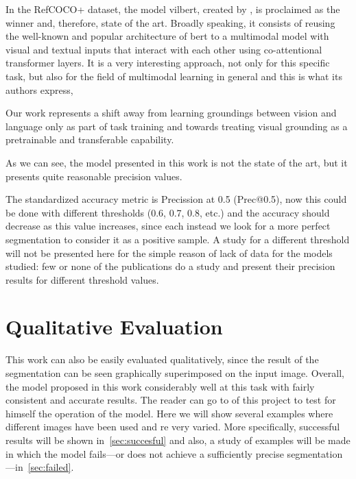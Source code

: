 In the RefCOCO+ dataset, the model \gls{vilbert}, created by
, is proclaimed as the winner and, therefore, state of the
art. Broadly speaking, it consists of reusing the well-known and popular
architecture of \gls{bert} to a multimodal model with visual and textual inputs
that interact with each other using co-attentional transformer layers. It is a
very interesting approach, not only for this specific task, but also for the
field of multimodal learning in general and this is what its authors express,

\begin{quoteBox}
  Our work represents a shift away from learning groundings between vision and
  language only as part of task training and towards treating visual grounding
  as a pretrainable and transferable capability.
  \tcblower{}
\end{quoteBox}

As we can see, the model presented in this work is not the state of the art,
but it presents quite reasonable precision values.

The standardized accuracy metric is Precission at 0.5 (Prec@0.5), now this
could be done with different thresholds (0.6, 0.7, 0.8, etc.) and the accuracy
should decrease as this value increases, since each instead we look for a more
perfect segmentation to consider it as a positive sample. A study for a
different threshold will not be presented here for the simple reason of lack of
data for the models studied: few or none of the publications do a study and
present their precision results for different threshold values.


\section{Qualitative Evaluation}\label{sec:qualitative-eval-res}

This work can also be easily evaluated qualitatively, since the result of the
segmentation can be seen graphically superimposed on the input image. Overall,
the model proposed in this work considerably well at this task with fairly
consistent and accurate results. The reader can go to
 of this project to test for
himself the operation of the model. Here we will show several examples where
different images have been used and \gls{re} very varied. More specifically,
successful results will be shown in\ \vref{sec:succesful} and also, a study of
examples will be made in which the model fails---or does not achieve a
sufficiently precise segmentation---in\ \vref{sec:failed}.


